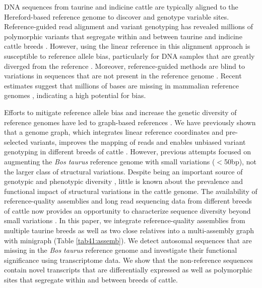 \documentclass[../main.tex]{subfiles}
\begin{document}
DNA sequences from taurine and indicine cattle are typically aligned to the Hereford-based reference genome to discover and genotype variable sites. Reference-guided read alignment and variant genotyping has revealed millions of polymorphic variants that segregate within and between taurine and indicine cattle breeds \citep{kim2020mosaic,daetwyler2014whole,koufariotis2018sequencing}. However, using the linear reference in this alignment approach is susceptible to reference allele bias, particularly for DNA samples that are greatly diverged from the reference \citep{ballouz2019time,pritt2018forge}. Moreover, reference-guided methods are blind to variations in sequences that are not present in the reference genome \citep{wong2020towards}. Recent estimates suggest that millions of bases are missing in mammalian reference genomes \citep{sherman2019assembly,whitacre2015s}, indicating a high potential for bias.

Efforts to mitigate reference allele bias and increase the genetic diversity of reference genomes have led to graph-based references \citep{garrison2018variation,eggertsson2017graphtyper}. We have previously shown that a genome graph, which integrates linear reference coordinates and pre-selected variants, improves the mapping of reads and enables unbiased variant genotyping in different breeds of cattle \citep{crysnanto2019accurate,crysnanto2020bovine}. However, previous attempts focused on augmenting the \emph{Bos taurus} reference genome with small variations ($<$50bp), not the larger class of structural variations. Despite being an important source of genotypic and phenotypic diversity \citep{song2020eight,kehr2017diversity}, little is known about the prevalence and functional impact of structural variations in the cattle genome. The availability of reference-quality assemblies and long read sequencing data from different breeds of cattle now provides an opportunity to characterize sequence diversity beyond small variations \citep{hickey2020genotyping,li2020design}. 
In this paper, we integrate reference-quality assemblies from multiple taurine breeds as well as two close relatives into a multi-assembly graph with minigraph \citep{li2020design} (Table \ref{tab41:assemb}). We detect autosomal sequences that are missing in the \emph{Bos taurus} reference genome and investigate their functional significance using transcriptome data. We show that the non-reference sequences contain novel transcripts that are differentially expressed as well as polymorphic sites that segregate within and between breeds of cattle.
\end{document}

